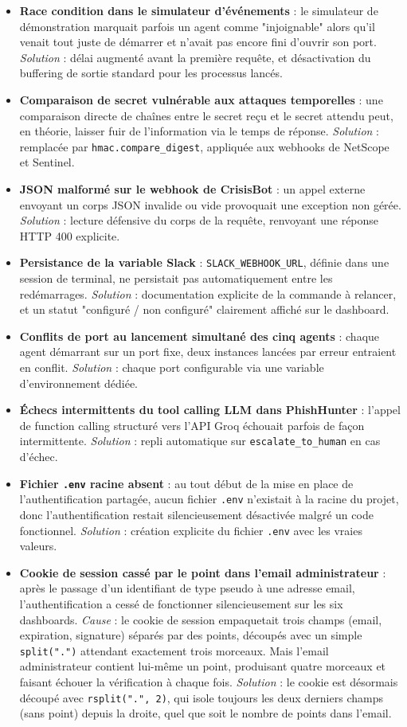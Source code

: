 \documentclass[12pt,a4paper]{report}
\begin{document}
\begin{itemize}[nosep]
\item \textbf{Race condition dans le simulateur d'événements} : le simulateur de démonstration marquait parfois un agent comme "injoignable" alors qu'il venait tout juste de démarrer et n'avait pas encore fini d'ouvrir son port. \emph{Solution} : délai augmenté avant la première requête, et désactivation du buffering de sortie standard pour les processus lancés.
\item \textbf{Comparaison de secret vulnérable aux attaques temporelles} : une comparaison directe de chaînes entre le secret reçu et le secret attendu peut, en théorie, laisser fuir de l'information via le temps de réponse. \emph{Solution} : remplacée par \texttt{hmac.compare\_digest}, appliquée aux webhooks de NetScope et Sentinel.
\item \textbf{JSON malformé sur le webhook de CrisisBot} : un appel externe envoyant un corps JSON invalide ou vide provoquait une exception non gérée. \emph{Solution} : lecture défensive du corps de la requête, renvoyant une réponse HTTP 400 explicite.
\item \textbf{Persistance de la variable Slack} : \texttt{SLACK\_WEBHOOK\_URL}, définie dans une session de terminal, ne persistait pas automatiquement entre les redémarrages. \emph{Solution} : documentation explicite de la commande à relancer, et un statut "configuré / non configuré" clairement affiché sur le dashboard.
\item \textbf{Conflits de port au lancement simultané des cinq agents} : chaque agent démarrant sur un port fixe, deux instances lancées par erreur entraient en conflit. \emph{Solution} : chaque port configurable via une variable d'environnement dédiée.
\item \textbf{Échecs intermittents du tool calling LLM dans PhishHunter} : l'appel de function calling structuré vers l'API Groq échouait parfois de façon intermittente. \emph{Solution} : repli automatique sur \texttt{escalate\_to\_human} en cas d'échec.
\item \textbf{Fichier \texttt{.env} racine absent} : au tout début de la mise en place de l'authentification partagée, aucun fichier \texttt{.env} n'existait à la racine du projet, donc l'authentification restait silencieusement désactivée malgré un code fonctionnel. \emph{Solution} : création explicite du fichier \texttt{.env} avec les vraies valeurs.
\item \textbf{Cookie de session cassé par le point dans l'email administrateur} : après le passage d'un identifiant de type pseudo à une adresse email, l'authentification a cessé de fonctionner silencieusement sur les six dashboards. \emph{Cause} : le cookie de session empaquetait trois champs (email, expiration, signature) séparés par des points, découpés avec un simple \texttt{split(".")} attendant exactement trois morceaux. Mais l'email administrateur contient lui-même un point, produisant quatre morceaux et faisant échouer la vérification à chaque fois. \emph{Solution} : le cookie est désormais découpé avec \texttt{rsplit(".", 2)}, qui isole toujours les deux derniers champs (sans point) depuis la droite, quel que soit le nombre de points dans l'email.
\end{itemize}
\end{document}
